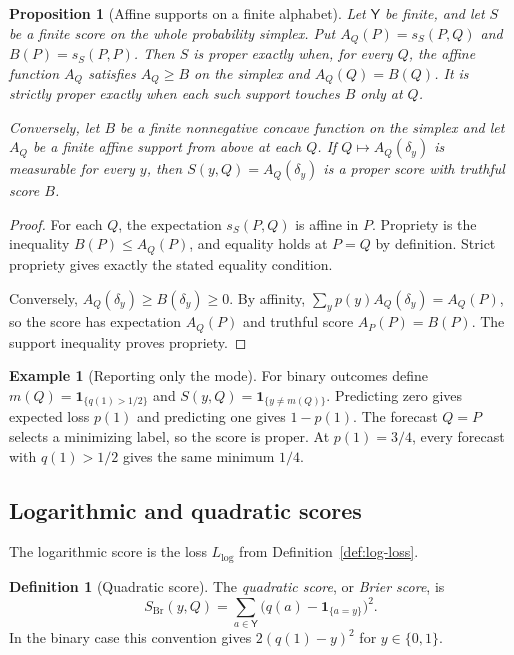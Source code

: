 \documentclass[11pt,oneside]{book}
\newtheorem{proposition}[theorem]{Proposition}
\theoremstyle{definition}
\newtheorem{definition}[theorem]{Definition}
\newtheorem{example}[theorem]{Example}
\theoremstyle{remark}
\begin{document}
\begin{proposition}[Affine supports on a finite alphabet]
\label{prop:proper-score-affine-support}
Let $\mathsf Y$ be finite, and let $S$ be a finite score on the whole
probability simplex. Put $A_Q(P)=s_S(P,Q)$ and $B(P)=s_S(P,P)$.
Then $S$ is proper exactly when, for every $Q$, the affine function
$A_Q$ satisfies $A_Q\geq B$ on the simplex and $A_Q(Q)=B(Q)$.
It is strictly proper exactly when each such support touches $B$
only at $Q$.

Conversely, let $B$ be a finite nonnegative concave function on the
simplex and let $A_Q$ be a finite affine support from above at each
$Q$. If $Q\mapsto A_Q(\delta_y)$ is measurable for every $y$, then
$S(y,Q)=A_Q(\delta_y)$ is a proper score with truthful score $B$.
\end{proposition}
\begin{proof}
For each $Q$, the expectation $s_S(P,Q)$ is affine in $P$.
Propriety is the inequality $B(P)\leq A_Q(P)$, and equality
holds at $P=Q$ by definition. Strict propriety gives exactly the
stated equality condition.

Conversely, $A_Q(\delta_y)\geq B(\delta_y)\geq0$. By affinity,
$\sum_y p(y)A_Q(\delta_y)=A_Q(P)$, so the score has expectation
$A_Q(P)$ and truthful score $A_P(P)=B(P)$. The support inequality
proves propriety.
\end{proof}

\begin{example}[Reporting only the mode]
\label{ex:proper-score-mode}
For binary outcomes define $m(Q)=\mathbf 1_{\{q(1)>1/2\}}$ and
$S(y,Q)=\mathbf 1_{\{y\ne m(Q)\}}$. Predicting zero gives expected
loss $p(1)$ and predicting one gives $1-p(1)$. The forecast $Q=P$
selects a minimizing label, so the score is proper. At $p(1)=3/4$,
every forecast with $q(1)>1/2$ gives the same minimum $1/4$.
\end{example}

\subsection{Logarithmic and quadratic scores}
\label{subsec:logarithmic-quadratic-scores}

The logarithmic score is the loss $L_{\log}$ from
Definition~\ref{def:log-loss}.

\begin{definition}[Quadratic score]
\label{def:quadratic-score}
The \emph{quadratic score}, or \emph{Brier score}, is
\[
S_{\mathrm{Br}}(y,Q)=
\sum_{a\in\mathsf Y}\bigl(q(a)-\mathbf 1_{\{a=y\}}\bigr)^2.
\]
In the binary case this convention gives $2(q(1)-y)^2$ for
$y\in\{0,1\}$.
\end{definition}
\end{document}
